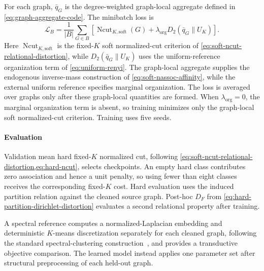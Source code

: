 For each graph, $\bar q_G$ is the degree-weighted graph-local aggregate defined in \cref{eq:graph-aggregate-code}.
The minibatch loss is
\begin{equation}
\mathcal L_B=\frac1{|B|}\sum_{G\in B}
\left[\operatorname{Ncut}_{K,\mathrm{soft}}(G)
+\lambda_{\mathrm{org}}D_2(\bar q_G\|U_K)\right].
\label{eq:malnet-ncut-loss}
\end{equation}
Here $\operatorname{Ncut}_{K,\mathrm{soft}}$ is the fixed-$K$ soft normalized-cut criterion of \cref{eq:soft-ncut-relational-distortion}, while $D_2(\bar q_G\|U_K)$ uses the uniform-reference organization term of \cref{eq:uniform-renyi}.
The graph-local aggregate supplies the endogenous inverse-mass construction of \cref{eq:soft-nassoc-affinity}, while the external uniform reference specifies marginal organization.
The loss is averaged over graphs only after these graph-local quantities are formed.
When $\lambda_{\mathrm{org}}=0$, the marginal organization term is absent, so training minimizes only the graph-local soft normalized-cut criterion.
Training uses five seeds.

\paragraph{Evaluation}
Validation mean hard fixed-$K$ normalized cut, following \cref{eq:soft-ncut-relational-distortion,eq:hard-ncut}, selects checkpoints.
An empty hard class contributes zero association and hence a unit penalty, so using fewer than eight classes receives the corresponding fixed-$K$ cost.
Hard evaluation uses the induced partition relation against the cleaned source graph.
Post-hoc $D_F$ from \cref{eq:hard-partition-dirichlet-distortion} evaluates a second relational property after training.

A spectral reference computes a normalized-Laplacian embedding and deterministic $K$-means discretization separately for each cleaned graph, following the standard spectral-clustering construction~\citep{ng2001spectral}, and provides a transductive objective comparison.
The learned model instead applies one parameter set after structural preprocessing of each held-out graph.

